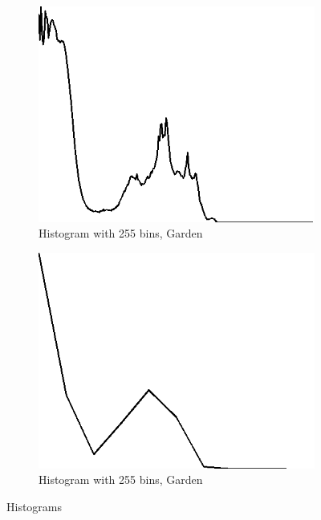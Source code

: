 \documentclass{article}
\begin{document}
\begin{figure}[H]
	\begin{subfigure}{0.4\textwidth}
		\includegraphics[width=\textwidth]{Generated/Garden_histogramOneChannel255bins.png}
		\caption{Histogram with 255 bins, Garden}
		\label{fig:hist255_Garden}
	\end{subfigure}
	\hfill
	\begin{subfigure}{0.4\textwidth}
		\includegraphics[width=\textwidth]{Generated/Garden_histogramOneChannel10bins.png}
		\caption{Histogram with 255 bins, Garden}
		\label{fig:hist10_Garden}
	\end{subfigure}
	\caption{Histograms}
	\label{fig:histograms}
\end{figure}
\end{document}
